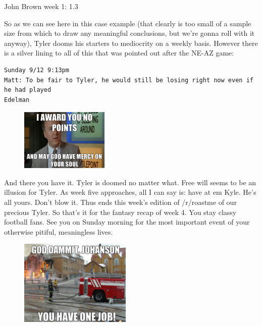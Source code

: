 \documentclass[11pt,letterpaper]{article}
\begin{document}
\par\noindent John Brown week 1: 1.3
\par\noindent So as we can see here in this case example (that clearly is too small of a sample size from which to draw any meaningful conclusions, but we're gonna roll with it anyway), Tyler dooms his starters to mediocrity on a weekly basis. However there is a silver lining to all of this that was pointed out after the NE-AZ game:
\begin{verbatim}
Sunday 9/12 9:13pm
Matt: To be fair to Tyler, he would still be losing right now even if he had played 
Edelman
\end{verbatim}
\begin{figure}
\vspace{-20pt}
\centering
\includegraphics[width=0.375\textwidth]{week4-nopoints.png}
\label{fig:week4-nopoints}
\end{figure} 
\par\noindent 
And there you have it. Tyler is doomed no matter what. Free will seems to be an illusion for Tyler. As week five approaches, all I can say is: have at em Kyle. He's all yours. Don't blow it. Thus ends this week's edition of /r/roastme of our precious Tyler. So that's it for the fantasy recap of week 4. You stay classy football fans. See you on Sunday morning for the most important event of your otherwise pitiful, meaningless lives.
\begin{figure}
\centering
\includegraphics[width=0.475\textwidth]{week4-onejob.png}
\label{fig:week4-onejob}
\end{figure} 
\\[5mm]
\end{document}
